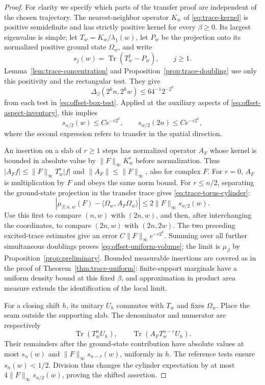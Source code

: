 \begin{proof}
For clarity we specify which parts of the transfer proof are
independent of the chosen trajectory.  The nearest-neighbor operator
$K_w$ of \eqref{eq:trace-kernel} is positive semidefinite and has
strictly positive kernel for every $\beta\ge0$.  Its largest
eigenvalue is simple; let $T_w=K_w/\lambda_1(w)$, let $P_w$ be the
projection onto its normalized positive ground state $\Omega_w$,
and write
\[
 s_j(w)=\operatorname{Tr}(T_w^j-P_w),\qquad j\ge1.
\]
Lemma~\ref{lem:trace-concentration} and
Proposition~\ref{prop:trace-doubling} use only this positivity and
the rectangular test.  They give
\[
 \Delta_\beta(2^kn,2^kw)\le64^{-1}2^{-2^k}
\]
from each test in \eqref{eq:offset-box-test}.  Applied at the
auxiliary aspects of \eqref{eq:offset-aspect-inventory}, this implies
\[
 s_{n/2}(w)\le Ce^{-c2^k},
 \qquad
 s_{w/2}(2n)\le Ce^{-c2^k},
\]
where the second expression refers to transfer in the spatial
direction.

An insertion on a slab of $r\ge1$ steps has normalized operator
$A_F$ whose kernel is bounded in absolute value by
$\|F\|_\infty K_w^r$ before normalization.  Thus
$|A_Ff|\le\|F\|_\infty T_w^r|f|$ and
$\|A_F\|\le\|F\|_\infty$, also for complex $F$.
For $r=0$, $A_F$ is multiplication by $F$ and obeys the same norm bound.
For $r\le n/2$, separating the ground-state projection in the
transfer trace gives \eqref{eq:trace-torus-cylinder}:
\[
 |\mu_{\beta;n,w}(F)-\langle\Omega_w,A_F\Omega_w\rangle|
       \le2\|F\|_\infty s_{n/2}(w).
\]
Use this first to compare $(n,w)$ with $(2n,w)$, and then, after
interchanging the coordinates, to compare $(2n,w)$ with $(2n,2w)$.
The two preceding excited-trace estimates give an error
$C\|F\|_\infty e^{-c2^k}$.  Summing over all further simultaneous
doublings proves \eqref{eq:offset-uniform-volume}; the limit is
$\mu_\beta$ by Proposition~\ref{prop:preliminary}.  Bounded
measurable insertions are covered as in the proof of
Theorem~\ref{thm:trace-uniform}: finite-support marginals have a
uniform density bound at this fixed $\beta$, and approximation in
product area measure extends the identification of the local limit.

For a closing shift $h$, its unitary $U_h$ commutes with $T_w$ and
fixes $\Omega_w$.  Place the seam outside the supporting slab.
The denominator and numerator are respectively
\[
 \operatorname{Tr}(T_w^nU_h),\qquad
 \operatorname{Tr}(A_FT_w^{n-r}U_h).
\]
Their remainders after the ground-state contribution have absolute
values at most $s_n(w)$ and $\|F\|_\infty s_{n-r}(w)$, uniformly
in $h$.  The reference tests ensure $s_n(w)<1/2$.  Division thus
changes the cylinder expectation by at most
$4\|F\|_\infty s_{n/2}(w)$, proving the shifted assertion.


\end{proof}
